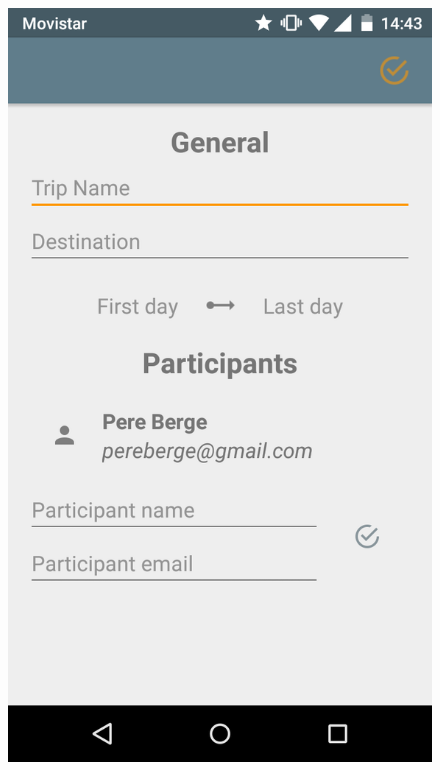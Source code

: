 \begin{itemize}
\clearpage

\begin{figure}[!h]
\centering
\includegraphics[scale=0.15]{Figures/cerarViatge.png}

\end{figure}
\end{itemize}
